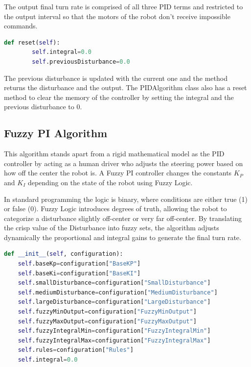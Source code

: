 The output final turn rate is comprised of all three PID terms and restricted to the output interval so that the motors of the robot don’t receive impossible commands.

\begin{lstlisting}[language=Python, caption={PIDAlgorithm reset method.}, label={lst:lk-init}]
def reset(self):
        self.integral=0.0
        self.previousDisturbance=0.0
\end{lstlisting}

The previous disturbance is updated with the current one and the method returns the disturbance and the output. The PIDAlgorithm class also has a reset method to clear the memory of the controller by setting the integral and the previous disturbance to 0.

\subsection{Fuzzy PI Algorithm}
\label{sec:fuzzy-pi}

This algorithm stands apart from a rigid mathematical model as the PID controller by acting as a human driver who adjusts the steering power based on how off the center the robot is. A Fuzzy PI controller changes the constants $K_P$ and $K_I$ depending on the state of the robot using Fuzzy Logic. 

In standard programming the logic is binary, where conditions are either true (1) or false (0). Fuzzy Logic introduces degrees of truth, allowing the robot to categorize a disturbance slightly off-center or very far off-center. By translating the crisp value of the Disturbance into fuzzy sets, the algorithm adjusts dynamically the proportional and integral gains to generate the final turn rate.

\begin{lstlisting}[language=Python, caption={FuzzyPIAlgorithm constructor.}, label={lst:lk-init}]
def __init__(self, configuration):
    self.baseKp=configuration["BaseKP"]
    self.baseKi=configuration["BaseKI"]
    self.smallDisturbance=configuration["SmallDisturbance"]
    self.mediumDisturbance=configuration["MediumDisturbance"]
    self.largeDisturbance=configuration["LargeDisturbance"]
    self.fuzzyMinOutput=configuration["FuzzyMinOutput"]
    self.fuzzyMaxOutput=configuration["FuzzyMaxOutput"]
    self.fuzzyIntegralMin=configuration["FuzzyIntegralMin"]
    self.fuzzyIntegralMax=configuration["FuzzyIntegralMax"]
    self.rules=configuration["Rules"]  
    self.integral=0.0
\end{lstlisting}

